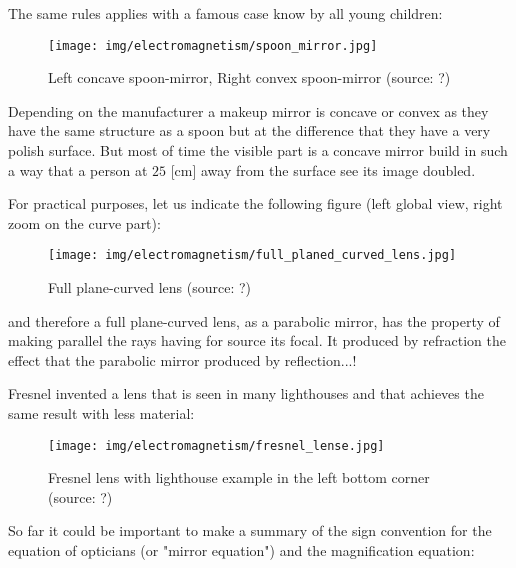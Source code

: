 	The same rules applies with a famous case know by all young children:
	\begin{figure}[H]
		\centering
		\texttt{[image: img/electromagnetism/spoon\_mirror.jpg]}
		\caption[Left concave spoon-mirror, Right convex spoon-mirror]{Left concave spoon-mirror, Right convex spoon-mirror (source: ?)}
	\end{figure}
	\begin{tcolorbox}[title=Remark,colframe=black,arc=10pt]
	Depending on the manufacturer a makeup mirror is concave or convex as they have the same structure as a spoon but at the difference that they have a very polish surface. But most of time the visible part is a concave mirror build in such a way that a person at $25$ [cm] away from the surface see its image doubled.
	\end{tcolorbox}
	For practical purposes, let us indicate the following figure (left global view, right zoom on the curve part):
	\begin{figure}[H]
		\centering
		\texttt{[image: img/electromagnetism/full\_planed\_curved\_lens.jpg]}
		\caption[Full plane-curved lens]{Full plane-curved lens (source: ?)}
	\end{figure}
	and therefore a full plane-curved lens, as a parabolic mirror, has the property of making parallel the rays having for source its focal. It produced by refraction the effect that the parabolic mirror produced by reflection...!

	Fresnel invented a lens that is seen in many lighthouses and that achieves the same result with less material:	
	\begin{figure}[H]
		\centering
		\texttt{[image: img/electromagnetism/fresnel\_lense.jpg]}
		\caption[Fresnel lens with lighthouse example in the left bottom corner]{Fresnel lens with lighthouse example in the left bottom corner (source: ?)}
	\end{figure}
	\pagebreak
	So far it could be important to make a summary of the sign convention for the equation of opticians (or "mirror equation") and the magnification equation:
	
